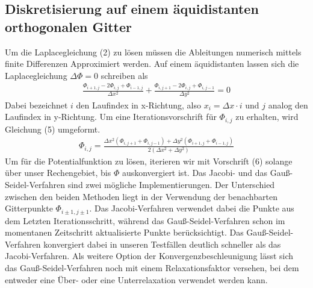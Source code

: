 \documentclass{article}
\begin{document}
\subsection{Diskretisierung auf einem äquidistanten orthogonalen Gitter}
Um die Laplacegleichung (2) zu lösen müssen die Ableitungen numerisch mittels finite Differenzen Approximiert werden.
Auf einem äquidistanten lassen sich die Laplacegleichung $\Delta \Phi = 0$ schreiben als
\begin{align}
\frac{\Phi_{i+1,j}-2\Phi_{i,j}+\Phi_{i-1,j}}{\Delta x^2}+\frac{\Phi_{i,j+1}-2\Phi_{i,j}+\Phi_{i,j-1}}{\Delta y^2}=0
\end{align}
Dabei bezeichnet $i$ den Laufindex in x-Richtung, also $x_i = \Delta x \cdot i$ und $j$ analog den Laufindex in y-Richtung.
Um eine Iterationsvorschrift für $\Phi_{i,j}$ zu erhalten, wird Gleichung (5) umgeformt.
\begin{align}
\Phi_{i,j} =\frac{\Delta x^2(\Phi_{i,j+1}+\Phi_{i,j-1})+\Delta y ^2(\Phi_{i+1,j}+\Phi_{i-1,j}) }{2(\Delta x^2 + \Delta y^2)}
\end{align}
Um für die Potentialfunktion zu lösen, iterieren wir mit Vorschrift (6) solange über unser Rechengebiet, bis $\Phi$ auskonvergiert ist.
Das Jacobi- und das Gauß-Seidel-Verfahren sind zwei mögliche Implementierungen. Der Unterschied zwischen den beiden Methoden liegt 
in der Verwendung der benachbarten Gitterpunkte $\Phi_{i\pm1, j\pm1}$. Das Jacobi-Verfahren verwendet dabei die Punkte aus dem Letzten Iterationsschritt,
während das Gauß-Seidel-Verfahren schon im momentanen Zeitschritt aktualisierte Punkte berücksichtigt. Das Gauß-Seidel-Verfahren konvergiert dabei in 
unseren Testfällen deutlich schneller als das Jacobi-Verfahren. Als weitere Option der Konvergenzbeschleunigung lässt sich das Gauß-Seidel-Verfahren 
noch mit einem Relaxationsfaktor versehen, bei dem entweder eine Über- oder eine Unterrelaxation verwendet werden kann.
\end{document}
